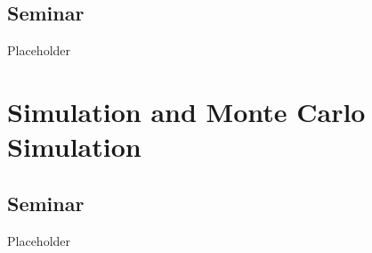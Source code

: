 \documentclass[]{article}
\begin{document}
\hypertarget{seminar-5}{%
\subsection{Seminar}\label{seminar-5}}

Placeholder

\hypertarget{simulation-and-monte-carlo-simulation}{%
\section{Simulation and Monte Carlo Simulation}\label{simulation-and-monte-carlo-simulation}}

\hypertarget{seminar-6}{%
\subsection{Seminar}\label{seminar-6}}

Placeholder
\end{document}
